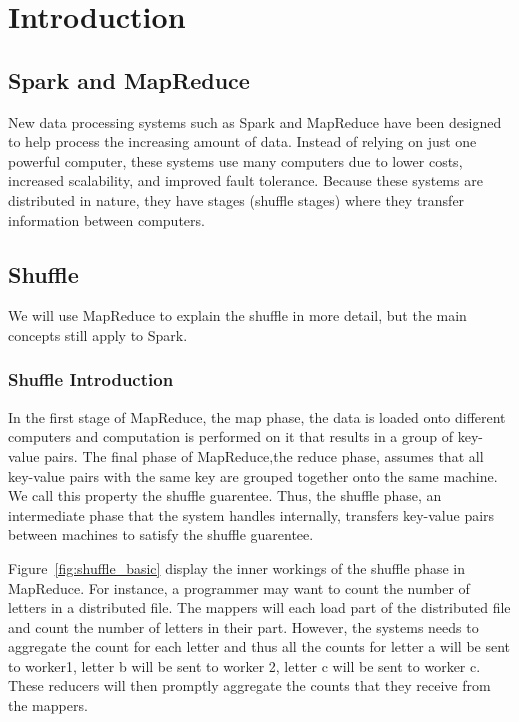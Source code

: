 \chapter{Introduction}\label{intro-ch}

\section{Spark and MapReduce}


New data processing systems such as Spark and MapReduce have been designed to help process the increasing amount of data. 
Instead of relying on just one powerful computer, these systems use many computers due to lower costs, increased scalability, and improved fault tolerance. 
Because these systems are distributed in nature, they have stages (shuffle stages) where they transfer information between computers. 
\section{Shuffle} 

We will use MapReduce to explain the shuffle in more detail, but the main concepts still apply to Spark.

\subsection{Shuffle Introduction}
In the first stage of MapReduce, the map phase, the data is loaded onto different computers and computation is performed on it that results 
in a group of key-value pairs. The final phase of MapReduce,the reduce phase, assumes that all key-value pairs with the same
key are grouped together onto the same machine. We call this property the shuffle guarentee. Thus, the shuffle phase, an intermediate phase that the system handles internally, transfers key-value pairs between machines to satisfy the shuffle guarentee. 


Figure~\ref{fig:shuffle_basic} display the inner workings 
of the shuffle phase in MapReduce. For instance, a programmer may  want to count the 
number of letters in a distributed file. The mappers will each load part of the distributed file and count the number of
letters in their part. However, the systems needs to aggregate the count for each letter and 
thus all the counts for letter a will be sent to worker1, letter b will be sent to worker 2,
letter c will be sent to worker c. These reducers will then promptly aggregate the counts that they receive from the 
mappers.

